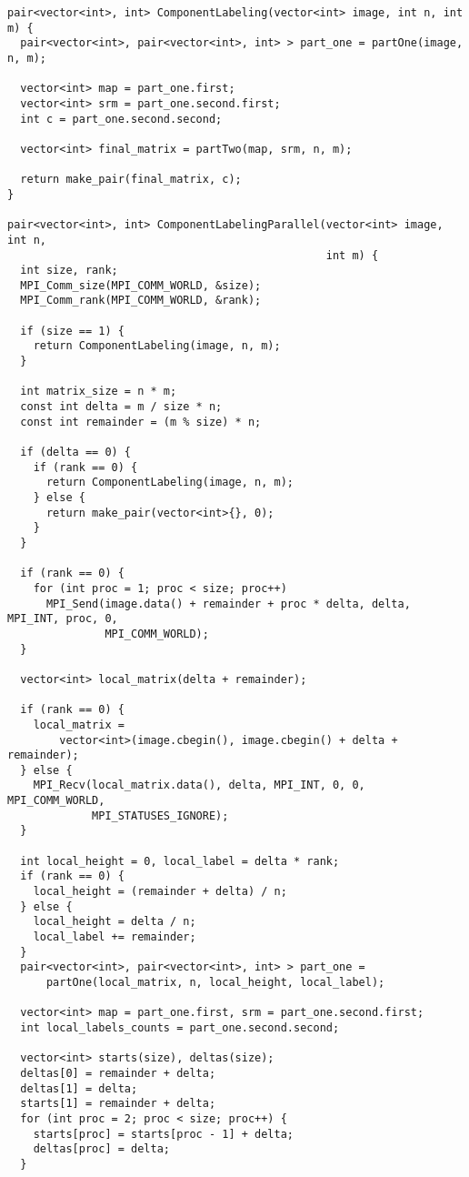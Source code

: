 \documentclass{report}
\begin{document}
\begin{lstlisting}
pair<vector<int>, int> ComponentLabeling(vector<int> image, int n, int m) {
  pair<vector<int>, pair<vector<int>, int> > part_one = partOne(image, n, m);

  vector<int> map = part_one.first;
  vector<int> srm = part_one.second.first;
  int c = part_one.second.second;

  vector<int> final_matrix = partTwo(map, srm, n, m);

  return make_pair(final_matrix, c);
}

pair<vector<int>, int> ComponentLabelingParallel(vector<int> image, int n,
                                                 int m) {
  int size, rank;
  MPI_Comm_size(MPI_COMM_WORLD, &size);
  MPI_Comm_rank(MPI_COMM_WORLD, &rank);

  if (size == 1) {
    return ComponentLabeling(image, n, m);
  }

  int matrix_size = n * m;
  const int delta = m / size * n;
  const int remainder = (m % size) * n;

  if (delta == 0) {
    if (rank == 0) {
      return ComponentLabeling(image, n, m);
    } else {
      return make_pair(vector<int>{}, 0);
    }
  }

  if (rank == 0) {
    for (int proc = 1; proc < size; proc++)
      MPI_Send(image.data() + remainder + proc * delta, delta, MPI_INT, proc, 0,
               MPI_COMM_WORLD);
  }

  vector<int> local_matrix(delta + remainder);

  if (rank == 0) {
    local_matrix =
        vector<int>(image.cbegin(), image.cbegin() + delta + remainder);
  } else {
    MPI_Recv(local_matrix.data(), delta, MPI_INT, 0, 0, MPI_COMM_WORLD,
             MPI_STATUSES_IGNORE);
  }

  int local_height = 0, local_label = delta * rank;
  if (rank == 0) {
    local_height = (remainder + delta) / n;
  } else {
    local_height = delta / n;
    local_label += remainder;
  }
  pair<vector<int>, pair<vector<int>, int> > part_one =
      partOne(local_matrix, n, local_height, local_label);

  vector<int> map = part_one.first, srm = part_one.second.first;
  int local_labels_counts = part_one.second.second;

  vector<int> starts(size), deltas(size);
  deltas[0] = remainder + delta;
  deltas[1] = delta;
  starts[1] = remainder + delta;
  for (int proc = 2; proc < size; proc++) {
    starts[proc] = starts[proc - 1] + delta;
    deltas[proc] = delta;
  }


\end{lstlisting}
\end{document}
